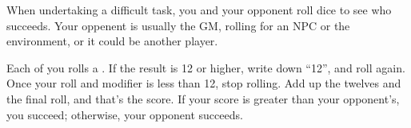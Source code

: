 
When undertaking a difficult task, you and your opponent roll dice to see who succeeds. Your oppenent is usually the GM, rolling for an NPC or the environment, or it could be another player.

Each of you rolls a . If the result is 12 or higher, write down ``12'', and roll again. Once your roll and modifier is less than 12, stop rolling. Add up the twelves and the final roll, and that's the score. If your score is greater than your opponent's, you succeed; otherwise, your opponent succeeds.
